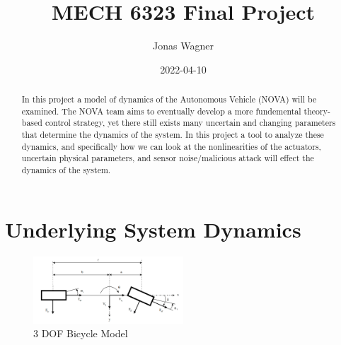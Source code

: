 \documentclass[conference, onecolumn]{IEEEtran}
\title{MECH 6323 Final Project\\ %
}
\author{Jonas Wagner}
\date{2022-04-10}
\begin{document}
\maketitle

\begin{abstract}
    In this project a model of dynamics of the Autonomous Vehicle (NOVA) will be examined. 
    The NOVA team aims to eventually develop a more fundemental theory-based control strategy, yet there still exists many uncertain and changing parameters that determine the dynamics of the system. 
    In this project a tool to analyze these dynamics, and specifically how we can look at the nonlinearities of the actuators, uncertain physical parameters, and sensor noise/malicious attack will effect the dynamics of the system.

\end{abstract}




\section{Underlying System Dynamics}



\begin{figure}%
    \centering
    \includegraphics[width=0.5\textwidth]{figs/3dof_model_diag.png}
    \caption{3 DOF Bicycle Model}
    \label{fig:3dof_bike_model}
\end{figure}
\end{document}
